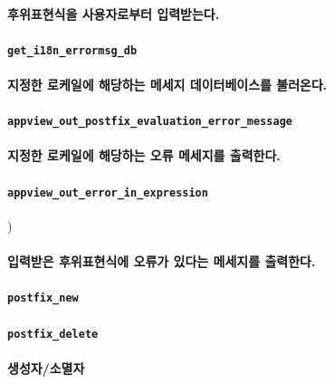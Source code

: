 \documentclass[UTF8]{report}
\begin{document}
            \paragraph{%
                \normalfont 후위표현식을 사용자로부터 입력받는다.
            }

            \paragraph{\texttt{get\_i18n\_errormsg\_db}}
            \paragraph{%
                \normalfont 지정한 로케일에 해당하는 메세지 데이터베이스를 불러온다.
            }

            \paragraph{\texttt{appview\_out\_postfix\_evaluation\_error\_message}}
            \paragraph{%
                \normalfont 지정한 로케일에 해당하는 오류 메세지를 출력한다.
            }

            \paragraph{\texttt{appview\_out\_error\_in\_expression}})
            \paragraph{%
                \normalfont 입력받은 후위표현식에 오류가 있다는 메세지를 출력한다.
            }

            \paragraph{\texttt{postfix\_new }}
            \paragraph{\texttt{postfix\_delete}}
            \paragraph{%
                \normalfont 생성자/소멸자
            }
\end{document}
